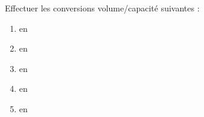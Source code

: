 \begin{exercice*}
   Effectuer les conversions volume/capacité suivantes :
   \begin{enumerate}
      \item {}       en \Capa[L]{}
      \item {}        en \Capa[L]{}
      \item {}      en \Vol[cm]{}
      \item {}   en \Vol[m]{}
      \item {}  en \Capa[dL]{}
   \end{enumerate}
\end{exercice*}